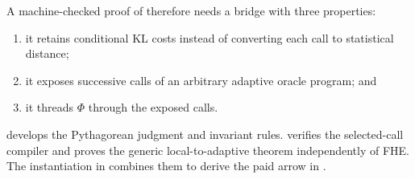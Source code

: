 A machine-checked proof of  therefore needs a bridge
with three properties:
\begin{enumerate}
\item it retains conditional KL costs instead of converting each call to
statistical distance;
\item it exposes successive calls of an arbitrary adaptive oracle program; and
\item it threads \(\Phi\) through the exposed calls.
\end{enumerate}
 develops the Pythagorean judgment and invariant rules.
 verifies the selected-call compiler and proves the
generic local-to-adaptive theorem independently of FHE.  The instantiation in
 combines them to derive the paid arrow in
.
